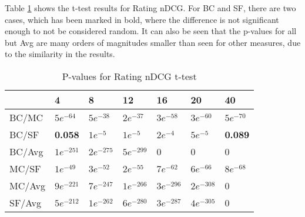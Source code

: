 Table \ref{tbl:andcg_ttest} shows the t-test results for Rating nDCG. For BC and SF, there are two cases, which has been marked in bold, where the difference is not significant enough to not be considered random. It can also be seen that the p-values for all but Avg are many orders of magnitudes smaller than seen for other measures, due to the similarity in the results.

\begin{table}[H]
	\centering
	\begin{tabular}{|l|llllll|}\hline
		& 4 & 8 & 12 & 16 & 20 & 40 \\\hline
		BC/MC	& $5e^{-64}$	& $5e^{-38}$	& $2e^{-37}$	& $3e^{-58}$	& $3e^{-60}$ & $5e^{-70}$ \\
		BC/SF	& \textbf{0.058}	& $1e^{-5}$	& $1e^{-5}$	& $2e^{-4}$	& $5e^{-5}$ & \textbf{0.089} \\
		BC/Avg	& $1e^{-251}$	& $2e^{-275}$ 	& $5e^{-299}$	& 0	& 0 & 0 \\
		MC/SF	& $1e^{-49}$	& $3e^{-52}$ 	& $2e^{-55}$	& $7e^{-62}$	& $6e^{-66}$ & $8e^{-68}$ \\
		MC/Avg	& $9e^{-221}$	& $7e^{-247}$ 	& $1e^{-266}$	& $3e^{-296}$	& $2e^{-308}$ & 0 \\
		SF/Avg	& $5e^{-212}$	& $1e^{-262}$ 	& $6e^{-280}$	& $3e^{-287}$	& $4e^{-305}$ & 0 \\ \hline
	\end{tabular}
	\caption{P-values for Rating nDCG t-test}
	\label{tbl:andcg_ttest}
\end{table}